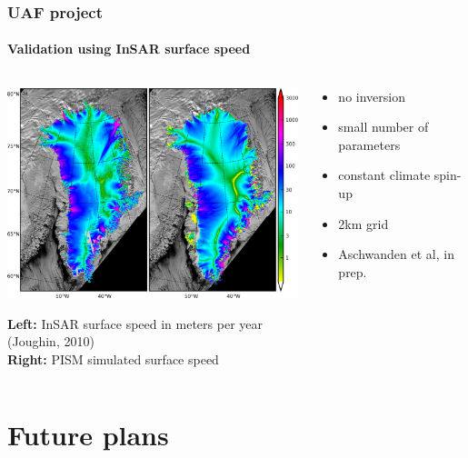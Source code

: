 \documentclass[hide notes,intlimits]{beamer}
\begin{document}
\begin{frame}
  \frametitle{UAF project}
  \framesubtitle{Validation using InSAR surface speed}
  \begin{columns}
    \begin{column}{90mm}
    \includegraphics[width=90mm]{csurf-insar-pism-hhcmb.png}
    \begin{center}
       \tiny \textbf{Left:} InSAR surface speed in meters per year (Joughin, 2010)\\
        \textbf{Right:} PISM simulated surface speed
   \end{center}
   \end{column}

    \begin{column}{35mm}
      \begin{itemize}
      \item no inversion
      \item small number of parameters
      \item constant climate spin-up
      \item 2km grid
      \item Aschwanden et al, in prep.
      \end{itemize}
    \end{column}
  \end{columns}

\end{frame}

\section{Future plans}
\end{document}
